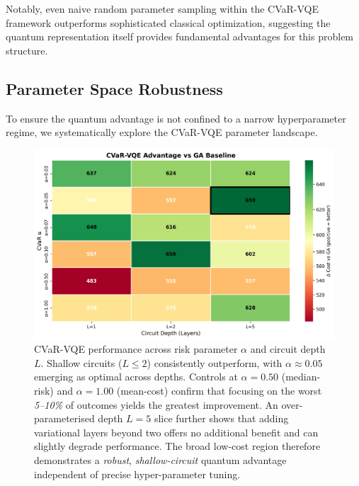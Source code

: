 Notably, even naive random parameter sampling within the CVaR-VQE framework outperforms sophisticated classical optimization, suggesting the quantum representation itself provides fundamental advantages for this problem structure.

\subsection{Parameter Space Robustness}

To ensure the quantum advantage is not confined to a narrow hyperparameter regime, we systematically explore the CVaR-VQE parameter landscape.


\begin{figure}[htb]
    \centering
    \includegraphics[width=0.8\linewidth]{figures/vqe_alpha_layer_heatmap.png}
    \caption{CVaR-VQE performance across risk parameter $\alpha$ and circuit depth $L$. Shallow circuits ($L \leq 2$) consistently outperform, with $\alpha \approx 0.05$ emerging as optimal across depths. Controls at $\alpha = 0.50$ (median-risk) and $\alpha = 1.00$ (mean-cost) confirm that focusing on the worst \emph{5--10\%} of outcomes yields the greatest improvement. An over-parameterised depth $L = 5$ slice further shows that adding variational layers beyond two offers no additional benefit and can slightly degrade performance. The broad low-cost region therefore demonstrates a \emph{robust}, \emph{shallow-circuit} quantum advantage independent of precise hyper-parameter tuning.}
    \label{fig:vqe_heatmap}
\end{figure}

